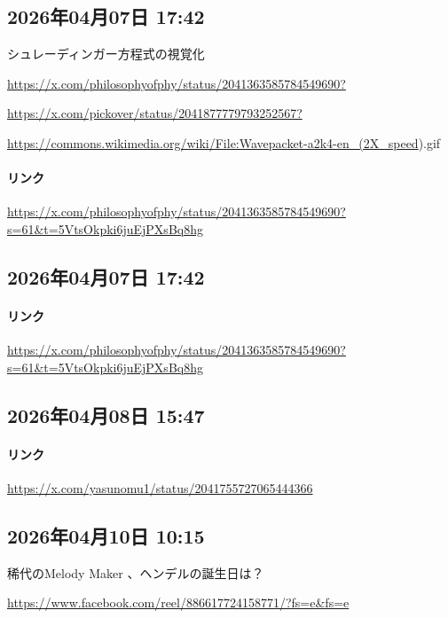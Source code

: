 \subsection*{2026年04月07日 17:42}

シュレーディンガー方程式の視覚化

\url{https://x.com/philosophyofphy/status/2041363585784549690?}

\url{https://x.com/pickover/status/2041877779793252567?}

\url{https://commons.wikimedia.org/wiki/File:Wavepacket-a2k4-en_(2X_speed}).gif

\paragraph{リンク}
\url{https://x.com/philosophyofphy/status/2041363585784549690?s=61&t=5VtsOkpki6juEjPXsBq8hg}

\subsection*{2026年04月07日 17:42}

\paragraph{リンク}
\url{https://x.com/philosophyofphy/status/2041363585784549690?s=61&t=5VtsOkpki6juEjPXsBq8hg}

\subsection*{2026年04月08日 15:47}

\paragraph{リンク}
\url{https://x.com/yasunomu1/status/2041755727065444366}

\subsection*{2026年04月10日 10:15}

稀代のMelody Maker 、ヘンデルの誕生日は？

\url{https://www.facebook.com/reel/886617724158771/?fs=e&fs=e}

